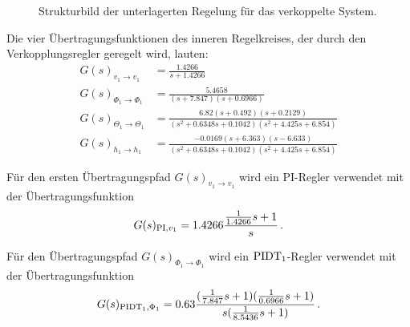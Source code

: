 \begin{figure}[h]
\centering
{}
\caption{Strukturbild der unterlagerten Regelung für das verkoppelte System.}
\label{fig:blockschaltbild_unterlagerung}
\end{figure}

Die vier Übertragungsfunktionen des inneren Regelkreises, der durch den Verkopplungsregler geregelt wird, lauten:
\begin{align}
G(s)_{v_1 \rightarrow v_1} &= \frac{1.4266}{s + 1.4266} \nonumber\\
G(s)_{\Phi_1 \rightarrow \Phi_1} &= \frac{5.4658}{(s+7.847)(s+0.6966)} \nonumber \\
G(s)_{\Theta_1 \rightarrow \Theta_1} &= \frac{6.82(s+0.492)(s+0.2129)}{(s^2+0.6348s+0.1042)(s^2+4.425s+6.854)} \\
G(s)_{h_1 \rightarrow h_1} &= \frac{-0.0169(s+6.363)(s-6.633)}{(s^2+0.6348s+0.1042)(s^2+4.425s+6.854)} \nonumber 
\label{eq:G_sys_coupling}
\end{align}

Für den ersten Übertragungspfad $G(s)_{v_1 \rightarrow v_1}$ wird ein PI-Regler verwendet mit der Übertragungsfunktion 
\begin{align*}
G(s)_{\textnormal{PI},v_1} = 1.4266\frac{\frac{1}{1.4266}s+1}{s} \, .
\end{align*}

Für den Übertragungspfad $G(s)_{\Phi_1 \rightarrow \Phi_1}$ wird ein $\textnormal{PIDT}_1$-Regler verwendet mit der Übertragungsfunktion 
\begin{align*}
G(s)_{\textnormal{PIDT}_1,\Phi_1} = 0.63\frac{(\frac{1}{7.847}s+1)(\frac{1}{0.6966}s+1)}{s(\frac{1}{8.5436}s+1)} \, .
\end{align*}

